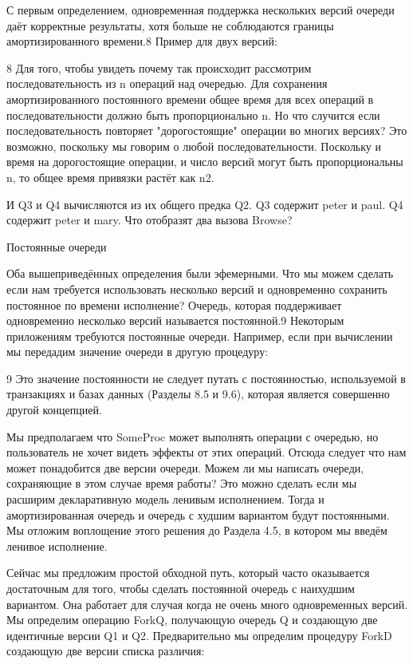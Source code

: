 С первым определением, одновременная поддержка нескольких версий очереди даёт корректные результаты, хотя больше не соблюдаются границы амортизированного времени.8 Пример для двух версий:

8 Для того, чтобы увидеть почему так происходит рассмотрим последовательность из n операций над очередью. Для сохранения амортизированного постоянного времени общее время для всех операций в последовательности должно быть пропорционально n. Но что случится если последовательность повторяет "дорогостоящие" операции во многих версиях? Это возможно, поскольку мы говорим о любой последовательности. Поскольку и время на дорогостоящие операции, и число версий могут быть пропорциональны n, то общее время привязки растёт как n2.

И Q3 и Q4 вычисляются из их общего предка Q2. Q3 содержит peter и paul. Q4 содержит peter и mary. Что отобразят два вызова Browse?

Постоянные очереди

Оба вышеприведённых определения были эфемерными. Что мы можем сделать если нам требуется использовать несколько версий и одновременно сохранить постоянное по времени исполнение? Очередь, которая поддерживает одновременно несколько версий называется постоянной.9 Некоторым приложениям требуются постоянные очереди. Например, если при вычислении мы передадим значение очереди в другую процедуру:

9 Это значение постоянности не следует путать с постоянностью, используемой в транзакциях и базах данных (Разделы 8.5 и 9.6), которая является совершенно другой концепцией.

Мы предполагаем что SomeProc может выполнять операции с очередью, но пользователь не хочет видеть эффекты от этих операций. Отсюда следует что нам может понадобится две версии очереди. Можем ли мы написать очереди, сохраняющие в этом случае время работы? Это можно сделать если мы расширим декларативную модель ленивым исполнением. Тогда и амортизированная очередь и очередь с худшим вариантом будут постоянными. Мы отложим воплощение этого решения до Раздела 4.5, в котором мы введём ленивое исполнение.

Сейчас мы предложим простой обходной путь, который часто оказывается достаточным для того, чтобы сделать постоянной очередь с наихудшим вариантом. Она работает для случая когда не очень много одновременных версий. Мы определим операцию ForkQ, получающую очередь Q и создающую две идентичные версии Q1 и Q2. Предварительно мы определим процедуру ForkD создающую две версии списка различия:

